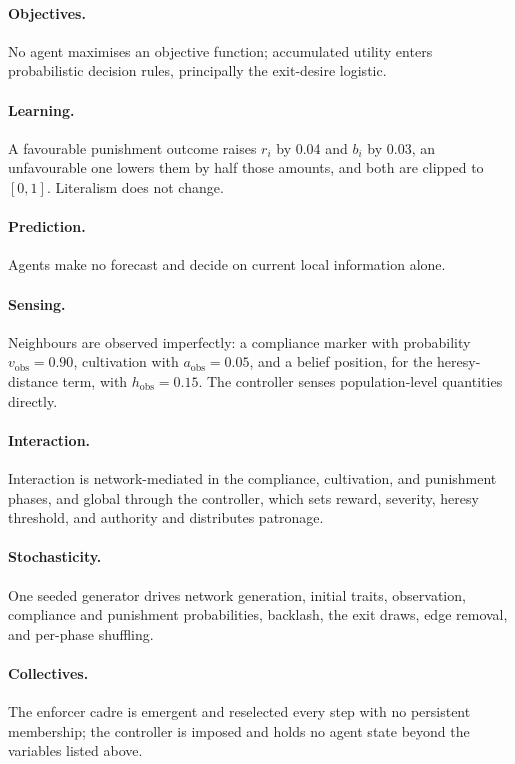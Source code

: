 \documentclass[12pt]{article}
\begin{document}
\paragraph{Objectives.} No agent maximises an objective function; accumulated
utility enters probabilistic decision rules, principally the exit-desire
logistic.

\paragraph{Learning.} A favourable punishment outcome raises \(r_i\) by 0.04 and
\(b_i\) by 0.03, an unfavourable one lowers them by half those amounts, and both
are clipped to \([0,1]\). Literalism does not change.

\paragraph{Prediction.} Agents make no forecast and decide on current local
information alone.

\paragraph{Sensing.} Neighbours are observed imperfectly: a compliance marker
with probability \(v_{\mathrm{obs}}=0.90\), cultivation with
\(a_{\mathrm{obs}}=0.05\), and a belief position, for the heresy-distance term,
with \(h_{\mathrm{obs}}=0.15\). The controller senses population-level
quantities directly.

\paragraph{Interaction.} Interaction is network-mediated in the compliance,
cultivation, and punishment phases, and global through the controller, which
sets reward, severity, heresy threshold, and authority and distributes
patronage.

\paragraph{Stochasticity.} One seeded generator drives network generation,
initial traits, observation, compliance and punishment probabilities, backlash,
the exit draws, edge removal, and per-phase shuffling.

\paragraph{Collectives.} The enforcer cadre is emergent and reselected every
step with no persistent membership; the controller is imposed and holds no agent
state beyond the variables listed above.
\end{document}

